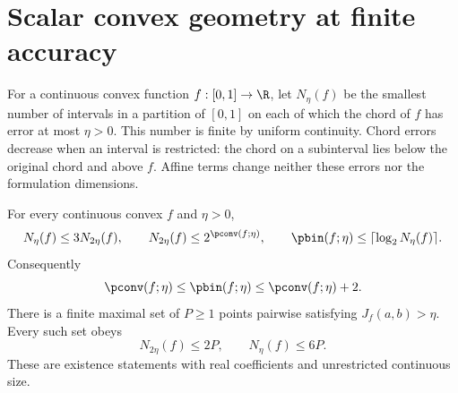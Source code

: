 \section{Scalar convex geometry at finite accuracy}\label{sec:scalar-geometry}

For a continuous convex function $f:[0,1]\to\R$, let
$N_\eta(f)$ be the smallest number of intervals in a partition of
$[0,1]$ on each of which the chord of $f$ has error at most $\eta>0$.
This number is finite by uniform continuity. Chord errors decrease when
an interval is restricted: the chord on a subinterval lies below the
original chord and above $f$. Affine terms change neither these errors
nor the formulation dimensions.

\begin{lemma}\label{lem:scalar-chords}
For every continuous convex $f$ and $\eta>0$,
\begin{equation}\label{eq:scalar-chord-counts}
 N_\eta(f)\le3N_{2\eta}(f),\qquad
 N_{2\eta}(f)\le2^{\pconv(f;\eta)},\qquad
 \pbin(f;\eta)\le\lceil\log_2N_\eta(f)\rceil.
\end{equation}
Consequently
\begin{equation}\label{eq:scalar-two-bit}
 \pconv(f;\eta)\le\pbin(f;\eta)\le\pconv(f;\eta)+2.
\end{equation}
There is a finite maximal set of $P\ge1$ points pairwise satisfying
$J_f(a,b)>\eta$. Every such set obeys
\begin{equation}\label{eq:scalar-packing-chords}
 N_{2\eta}(f)\le2P,\qquad N_\eta(f)\le6P.
\end{equation}
These are existence statements with real coefficients and unrestricted
continuous size.
\end{lemma}
